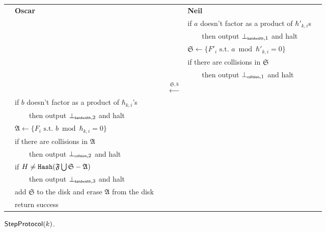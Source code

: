 \documentclass[11pt]{llncs}
\begin{document}
\begin{figure}
\begin{center}
\begin{tabular}{|lcl|}\hline
~~{\bf Oscar}                       &                                                      & {\bf Neil}~\\
                                   &                                                       &if $a$ doesn't factor as a product of $\hbar'_{k,i}$s~~\\
                                   &                                                       &~~~~then output $\bot_{\mbox{{\tiny {\sf bandwidth}}},1}$ and halt~~\\
                                   &                                                       &$\mathfrak{S}\leftarrow\{F'_i \mbox{~s.t.~} a \bmod \hbar'_{k,i} =0\}$~~\\
~~                                 &                                                       &if there are collisions in $\mathfrak{S}$\\
                                   &                                                       &~~~~then output $\bot_{\mbox{{\tiny {\sf collision}}},1}$ and halt~~\\
                                   &~~{\LARGE $\stackrel{\mathfrak{S},b}{\longleftarrow}$} &\\
~~if $b$ doesn't factor as a product of $\hbar_{k,i}$'s&&\\
~~~~~~then output $\bot_{\mbox{{\tiny {\sf bandwidth}}},2}$ and halt &&\\
~~$\mathfrak{A}\leftarrow\{F_i \mbox{~s.t.~} b \bmod \hbar_{k,i} =0\}$ &&\\
~~if there are collisions in $\mathfrak{A}$ &                                   & \\
~~~~~~then output $\bot_{\mbox{{\tiny {\sf collision}}},2}$ and halt~~&                      &~~\\
~~if $H \neq \mbox{{\tt Hash}}(\mathfrak{F}\bigcup\mathfrak{S} - \mathfrak{A})$ &                                                      &\\
~~~~~~then output $\bot_{\mbox{{\tiny {\sf bandwidth}}},3}$ and halt &&\\
~~add $\mathfrak{S}$ to the disk and erase $\mathfrak{A}$ from the disk &                                                      &\\
~~return {\sf success} &                                                      &\\\hline
\end{tabular}
\end{center}
\caption{$\mbox{{\sf StepProtocol}}(k)$.}\label{fig:step}
\end{figure}
\end{document}
